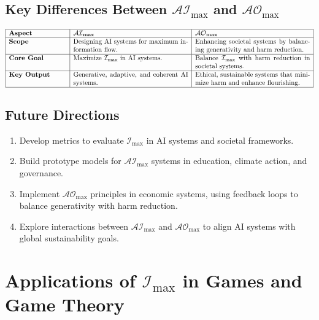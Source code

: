 \documentclass[12pt]{article}
\begin{document}
\subsection{Key Differences Between \( \mathcal{AI}_{\text{max}} \) and \( \mathcal{AO}_{\text{max}} \)}

\[
\begin{array}{|p{3cm}|p{6cm}|p{6cm}|}
\hline
\textbf{Aspect} & \textbf{\( \mathcal{AI}_{\text{max}} \)} & \textbf{\( \mathcal{AO}_{\text{max}} \)} \\
\hline
\textbf{Scope} & Designing AI systems for maximum information flow. & Enhancing societal systems by balancing generativity and harm reduction. \\
\hline
\textbf{Core Goal} & Maximize \( \mathcal{I}_{\text{max}} \) in AI systems. & Balance \( \mathcal{I}_{\text{max}} \) with harm reduction in societal systems. \\
\hline
\textbf{Key Output} & Generative, adaptive, and coherent AI systems. & Ethical, sustainable systems that minimize harm and enhance flourishing. \\
\hline
\end{array}
\]

\subsection{Future Directions}
\begin{enumerate}
    \item Develop metrics to evaluate \( \mathcal{I}_{\text{max}} \) in AI systems and societal frameworks.
    \item Build prototype models for \( \mathcal{AI}_{\text{max}} \) systems in education, climate action, and governance.
    \item Implement \( \mathcal{AO}_{\text{max}} \) principles in economic systems, using feedback loops to balance generativity with harm reduction.
    \item Explore interactions between \( \mathcal{AI}_{\text{max}} \) and \( \mathcal{AO}_{\text{max}} \) to align AI systems with global sustainability goals.
\end{enumerate}



\section{Applications of \(\mathcal{I}_{\text{max}}\) in Games and Game Theory}
\end{document}
